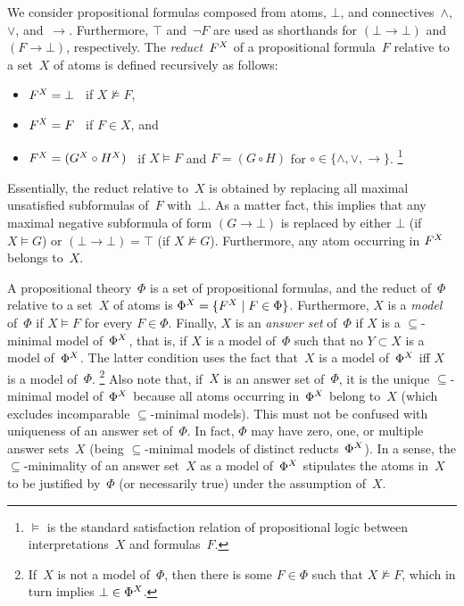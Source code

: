 We consider propositional formulas composed from atoms, $\bot$,
and connectives~$\wedge$, $\vee$, and~$\rightarrow$.
Furthermore, $\top$ and~$\neg F$ are used as shorthands for
$(\bot\rightarrow\bot)$ and $(F\rightarrow\bot)$, respectively.
The \emph{reduct}~$F^{X}$ of a propositional formula~$F$
relative to a set~$X$ of atoms is defined recursively as follows:
\begin{itemize}
\item $F^{X}=\bot$ ~if $X\not\models F$,
\item $F^{X}=F$ ~if $F\in X$, and
\item $F^{X}=(G^{X}\circ H^{X})$ ~if 
      $X\models F$ and $F=(G\circ H)$ for $\circ\in\{\wedge,\vee,\rightarrow\}$.%
\footnote{$\models$ is the standard satisfaction relation of propositional logic
  between interpretations~$X$ and formulas~$F$.}
\end{itemize}
Essentially, the reduct relative to~$X$ is obtained by replacing
all maximal unsatisfied subformulas of~$F$ with~$\bot$.
As a matter fact, this implies that any maximal negative subformula 
of form $(G\rightarrow \bot)$ is replaced by either $\bot$ (if $X\models G$)
or $(\bot\rightarrow\bot)=\top$ (if $X\not\models G$).
Furthermore, any atom occurring in $F^{X}$ belongs to~$X$.

A propositional theory~$\Phi$ is a set of propositional formulas,
and the reduct of~$\Phi$
relative to a set~$X$ of atoms is
$\Phi^{X}=\{F^{X} \mid F\in\Phi\}$.
Furthermore, $X$ is a \emph{model} of~$\Phi$ if $X\models F$
for every $F\in\Phi$.
Finally, $X$ is an \emph{answer set} of~$\Phi$ if
$X$ is a $\subseteq$-minimal model of~$\Phi^{X}$, that is,
if $X$ is a model of~$\Phi$ such that no $Y\subset X$
is a model of~$\Phi^{X}$.
The latter condition uses the fact that~$X$ is a model of~$\Phi^{X}$
iff $X$ is a model of~$\Phi$.%
\footnote{If~$X$ is not a model of~$\Phi$, then 
  there is some $F\in\Phi$ such that $X\not\models F$,
  which in turn implies $\bot\in\Phi^{X}$.}
Also note that, if~$X$ is an answer set of~$\Phi$,
it is the unique $\subseteq$-minimal model of~$\Phi^{X}$
because all atoms occurring in~$\Phi^{X}$ belong to~$X$
(which excludes incomparable $\subseteq$-minimal models).
This must not be confused
with uniqueness of an answer set of~$\Phi$.
In fact, $\Phi$ may have zero, one,
or multiple answer sets~$X$ (being $\subseteq$-minimal models of
distinct reducts~$\Phi^{X}$).
In a sense, the $\subseteq$-minimality of an answer set~$X$ as a 
model of~$\Phi^{X}$ stipulates the atoms in~$X$ to be justified by~$\Phi$
(or necessarily true) under the assumption of~$X$.

